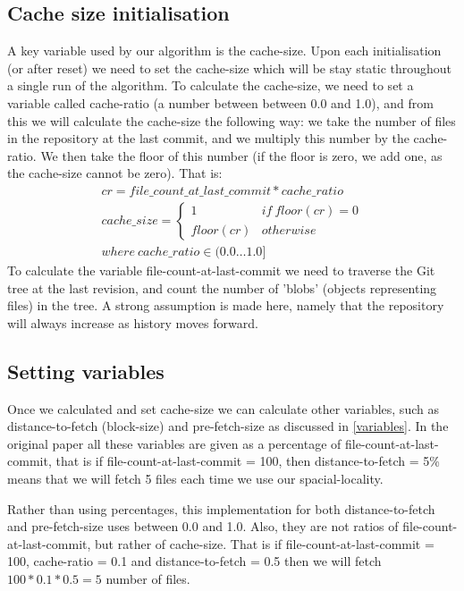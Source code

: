 \documentclass[12pt,twoside,notitlepage]{report}
\begin{document}
\subsection{Cache size initialisation} A key variable used by our algorithm is the cache-size. Upon each initialisation (or after reset) we need to set the cache-size which will be stay static throughout a single run of the algorithm. To calculate the cache-size, we need to set a variable called cache-ratio (a number between between 0.0 and 1.0), and from this we will calculate the cache-size the following way: we take the number of files in the repository at the last commit, and we multiply this number by the cache-ratio. We then take the floor of this number (if the floor is zero, we add one, as the cache-size cannot be zero). That is:
\begin{align*}
	cr = file\_count\_at\_last\_commit*cache\_ratio\\
	cache\_size = \begin{cases}
						1 & if\ floor(cr) = 0\\
						floor(cr) & otherwise
					\end{cases}\\
	where\ cache\_ratio \in (0.0\dots 1.0]
\end{align*}
To calculate the variable file-count-at-last-commit we need to traverse the Git tree at the last revision, and count the number of 'blobs' (objects representing files) in the tree. A strong assumption is made here, namely that the repository will always increase as history moves forward. 

\subsection{Setting variables} Once we calculated and set cache-size we can calculate other variables, such as distance-to-fetch (block-size) and pre-fetch-size as discussed in \ref{variables}. In the original paper all these variables are given as a percentage of file-count-at-last-commit, that is if file-count-at-last-commit = 100, then distance-to-fetch = 5\% means that we will fetch 5 files each time we use our spacial-locality.

Rather than using percentages, this implementation for both distance-to-fetch and pre-fetch-size uses between 0.0 and 1.0. Also, they are not ratios of file-count-at-last-commit, but rather of cache-size. That is if file-count-at-last-commit = 100, cache-ratio = 0.1 and distance-to-fetch = 0.5 then we will fetch $100*0.1*0.5 = 5$ number of files.
\end{document}

